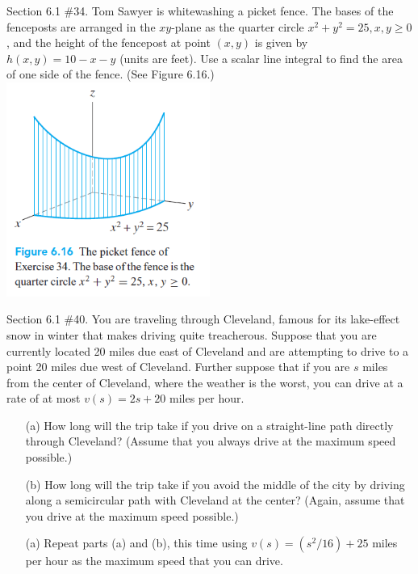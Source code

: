 \documentclass[12pt,letterpaper]{hmcpset}
\begin{document}
\begin{problem}
Section 6.1 \#34. Tom Sawyer is whitewashing a picket fence. The bases of the fenceposts are arranged in the $xy$-plane as the quarter circle $x^2 + y^2 = 25, x, y \geq 0$, and the height of the fencepost at point $(x, y)$ is given by $h(x, y) = 10 - x - y$ (units are feet). Use a scalar line integral to find the area of one side of the fence. (See Figure 6.16.)\\
\includegraphics[width=0.5\textwidth]{figure6-16.png}
\end{problem}

\newpage

\begin{problem}
Section 6.1 \#40. You are traveling through Cleveland, famous for its lake-effect snow in winter that makes driving quite treacherous. Suppose that you are currently located 20 miles due east of Cleveland and are attempting to drive to a point 20 miles due west of Cleveland. Further suppose that if you are $s$ miles from the center of Cleveland, where the weather is the worst, you can drive at a rate of at most $v(s) = 2s + 20$ miles per hour.
\begin{enumerate}
	\item[(a)] How long will the trip take if you drive on a straight-line path directly through Cleveland? (Assume that you always drive at the maximum speed possible.)
	\item[(b)] How long will the trip take if you avoid the middle of the city by driving along a semicircular path with Cleveland at the center? (Again, assume that you drive at the maximum speed possible.)
	\item[(a)] Repeat parts (a) and (b), this time using $v(s) = (s^2 / 16) + 25$ miles per hour as the maximum speed that you can drive.
\end{enumerate}
\end{problem}
\end{document}
